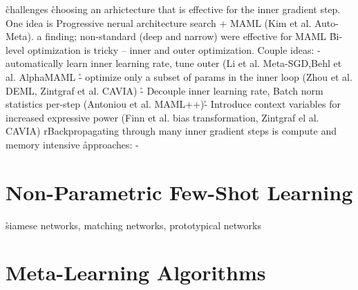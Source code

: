 \r{challenges}
\r{choosing an arhictecture that is effective for the inner gradient step. One idea is Progressive nerual architecture search + MAML (Kim et al. Auto-Meta). a finding; non-standard (deep and narrow) were effective for MAML}
\r{Bi-level optimization is tricky -- inner and outer optimization. Couple ideas: - automatically learn inner learning rate, tune outer (Li et al. Meta-SGD,Behl et al. AlphaMAML} \r{- optimize only a subset of params in the inner loop (Zhou et al. DEML, Zintgraf et al. CAVIA)} \r{- Decouple inner learning rate, Batch norm statistics per-step (Antoniou et al. MAML++)}\r{- Introduce context variables for increased expressive power (Finn et al. bias transformation, Zintgraf el al. CAVIA)}
r{Backpropagating through many inner gradient steps is compute and memory intensive}
\r{approaches: - }


\section{Non-Parametric Few-Shot Learning}
\r{siamese networks, matching networks, prototypical networks}


\section{Meta-Learning Algorithms}
